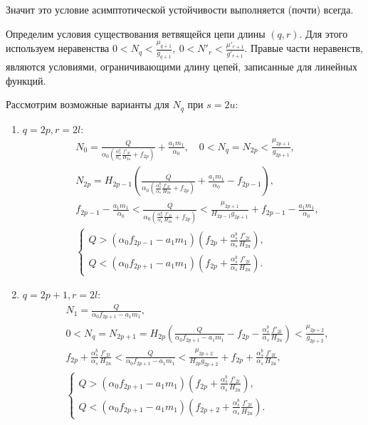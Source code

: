 Значит это условие асимптотической устойчивости выполняется (почти) всегда.

Определим условия существования ветвящейся цепи длины \((q, r)\). Для этого используем неравенства \(0 < N_q < \frac{\mu_{q+1}}{g_{q+1}}, ~ 0 < N'_r < \frac{\mu'_{r+1}}{g'_{r+1}}\). Правые части неравенств, являются условиями, ограничивающими длину цепей, записанные для линейных функций. 

Рассмотрим возможные варианты для \(N_q\) при \(s=2u\):
\begin{enumerate}[leftmargin=10pt,itemindent=26pt]
    \item \(q = 2p, r = 2l\):
    \begin{align*}
        & N_0 = \frac{Q}{\alpha_0 \left( \frac{\alpha^b_s}{\alpha_s} \frac{f'_{2l}}{H_{2u}} + f_{2p} \right)} + \frac{a_1 m_1}{\alpha_0}, \quad 0 < N_q = N_{2p} < \frac{\mu_{2p+1}}{g_{2p+1}}, \\
        & N_{2p} = H_{2p-1} \left( \frac{Q}{\alpha_0 \left( \frac{\alpha^b_s}{\alpha_s} \frac{f'_{2l}}{H_{2u}} + f_{2p} \right)} + \frac{a_1 m_1}{\alpha_0} - f_{2p-1} \right), \\
        & f_{2p-1} - \frac{a_1 m_1}{\alpha_0} < \frac{Q}{\alpha_0 \left( \frac{\alpha^b_s}{\alpha_s} \frac{f'_{2l}}{H_{2u}} + f_{2p} \right)} < \frac{\mu_{2p+1}}{H_{2p-1} g_{2p+1}} + f_{2p-1} - \frac{a_1 m_1}{\alpha_0}, \\
        & \begin{cases}
            Q > \left( \alpha_0 f_{2p-1} - a_1 m_1 \right) \left( f_{2p} + \frac{\alpha^b_s}{\alpha_s} \frac{f'_{2l}}{H_{2u}} \right), \\
            Q < \left( \alpha_0 f_{2p+1} - a_1 m_1 \right) \left( f_{2p} + \frac{\alpha^b_s}{\alpha_s} \frac{f'_{2l}}{H_{2u}} \right).
        \end{cases}
    \end{align*}

    \item \(q = 2p+1, r = 2l\):
    \begin{align*}
        & N_1 = \frac{Q}{\alpha_0 f_{2p+1} - a_1 m_1}, \\
        & 0 < N_{q} = N_{2p+1} = H_{2p} \left( \frac{Q}{\alpha_0 f_{2p+1} - a_1 m_1} - f_{2p} - \frac{\alpha^b_s}{\alpha_s} \frac{f'_{2l}}{H_{2u}} \right) < \frac{\mu_{2p+2}}{g_{2p+2}}, \\
        & f_{2p} + \frac{\alpha^b_s}{\alpha_s} \frac{f'_{2l}}{H_{2u}} < \frac{Q}{\alpha_0 f_{2p+1} - a_1 m_1} < \frac{\mu_{2p+2}}{H_{2p} g_{2p+2}} + f_{2p} + \frac{\alpha^b_s}{\alpha_s} \frac{f'_{2l}}{H_{2u}}, \\
        & \begin{cases}
            Q > \left( \alpha_0  f_{2p+1} - a_1 m_1 \right) \left( f_{2p} + \frac{\alpha^b_s}{\alpha_s} \frac{f'_{2l}}{H_{2u}} \right), \\
            Q < \left( \alpha_0 f_{2p+1} - a_1 m_1 \right) \left( f_{2p+2} + \frac{\alpha^b_s}{\alpha_s} \frac{f'_{2l}}{H_{2u}} \right).
        \end{cases}
    \end{align*}


\end{enumerate}

